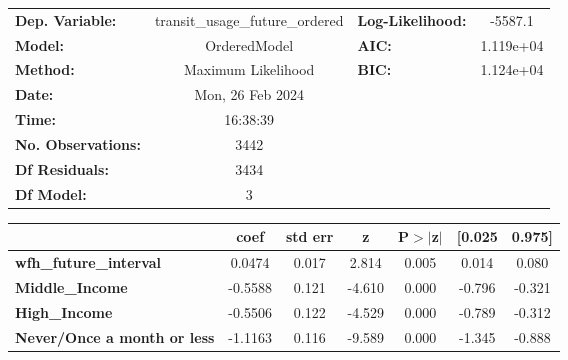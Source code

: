 \documentclass{report}
\begin{document}
\begin{center}
\begin{tabular}{lclc}
\toprule
\textbf{Dep. Variable:}                           & transit\_usage\_future\_ordered & \textbf{  Log-Likelihood:    } &   -5587.1   \\
\textbf{Model:}                                   &           OrderedModel          & \textbf{  AIC:               } & 1.119e+04   \\
\textbf{Method:}                                  &        Maximum Likelihood       & \textbf{  BIC:               } & 1.124e+04   \\
\textbf{Date:}                                    &         Mon, 26 Feb 2024        & \textbf{                     } &             \\
\textbf{Time:}                                    &             16:38:39            & \textbf{                     } &             \\
\textbf{No. Observations:}                        &                3442             & \textbf{                     } &             \\
\textbf{Df Residuals:}                            &                3434             & \textbf{                     } &             \\
\textbf{Df Model:}                                &                   3             & \textbf{                     } &             \\
\bottomrule
\end{tabular}
\begin{tabular}{lcccccc}
                                                  & \textbf{coef} & \textbf{std err} & \textbf{z} & \textbf{P$> |$z$|$} & \textbf{[0.025} & \textbf{0.975]}  \\
\midrule
\textbf{wfh\_future\_interval}                    &       0.0474  &        0.017     &     2.814  &         0.005        &        0.014    &        0.080     \\
\textbf{Middle\_Income}                           &      -0.5588  &        0.121     &    -4.610  &         0.000        &       -0.796    &       -0.321     \\
\textbf{High\_Income}                             &      -0.5506  &        0.122     &    -4.529  &         0.000        &       -0.789    &       -0.312     \\
\textbf{Never/Once a month or less}               &      -1.1163  &        0.116     &    -9.589  &         0.000        &       -1.345    &       -0.888     \\

\end{tabular}
\end{center}
\end{document}
